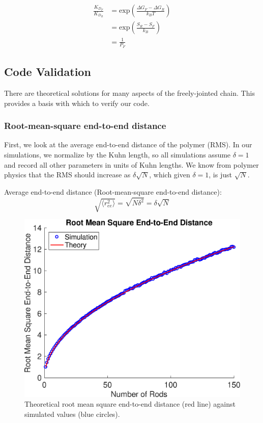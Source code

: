 \documentclass[../AdvancementSummary.tex]{subfiles}
\begin{document}
\begin{align} 
\frac{K_{D_F}}{K_{D_R}} &= \mbox{exp} \left(\frac{\Delta G_F-\Delta G_R}{k_B T}\right) \\
&= \mbox{exp} \left(\frac{S_R-S_F}{k_B}\right) \\
&= \frac{1}{P_F}
\end{align}  


\subsection{Code Validation}
There are theoretical solutions for many aspects of the freely-jointed chain.  This provides a basis with which to verify our code.  

\subsubsection{Root-mean-square end-to-end distance}
First, we look at the average end-to-end distance of the polymer (RMS). In our simulations, we normalize by the Kuhn length, so all simulations assume $\delta = 1$ and record all other parameters in units of Kuhn lengths.  We know from polymer physics that the RMS should increase as $\delta \sqrt{N}$, which given $\delta = 1$, is just $\sqrt{N}$.

Average end-to-end distance (Root-mean-square end-to-end distance):
\begin{equation*}
\sqrt{\langle r_{ee}^2 \rangle} = \sqrt{N\delta^2} = \delta \sqrt{N}
\end{equation*}

\begin{figure}[H]
\begin{center}
\includegraphics[width=0.5\linewidth]{ModelConfirmationFigures/RMSEndtoEnd.eps}
\caption{Theoretical root mean square end-to-end distance (red line) against simulated values (blue circles). \label{fig: RMS}}
\end{center}
\end{figure}
\end{document}
